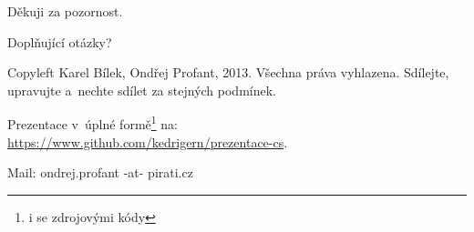 \documentclass[xetex]{beamer}
\begin{document}
\begin{frame}

	Děkuji za pozornost.

	\bigskip
	
	Doplňující otázky?

	\bigskip

	\bigskip

	\scriptsize
	Copyleft Karel Bílek, Ondřej Profant, 2013. Všechna práva vyhlazena. Sdílejte, upravujte a~nechte sdílet za stejných podmínek. 

	\bigskip

	Prezentace v~úplné formě\footnote{i se zdrojovými kódy} na:\\ 
	\url{https://www.github.com/kedrigern/prezentace-cs}.

	\bigskip

	Mail: ondrej.profant -at- pirati.cz 
\end{frame}
\end{document}
